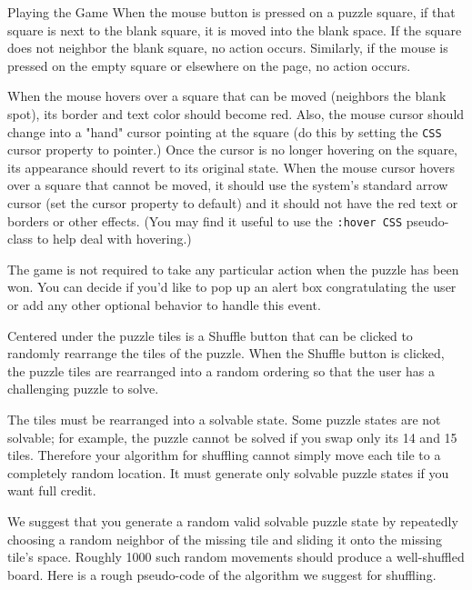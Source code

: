 \documentclass[programming]{../../../../mfcs}
\begin{document}
\begin{question}{Playing the Game}
When the mouse button is pressed on a puzzle square, if that square is next to the blank square, it is moved into the
blank space. If the square does not neighbor the blank square, no action occurs. Similarly, if the mouse is pressed
on the empty square or elsewhere on the page, no action occurs.
\newline

When the mouse hovers over a square that can be moved (neighbors the blank spot), its border and text color
should become red. Also, the mouse cursor should change into a "hand" cursor pointing at the square (do this by
setting the \texttt{CSS} cursor property to pointer.) Once the cursor is no longer hovering on the square, its appearance
should revert to its original state. When the mouse cursor hovers over a square that cannot be moved, it should use
the system's standard arrow cursor (set the cursor property to default) and it should not have the red text or
  borders or other effects. (You may find it useful to use the \texttt{:hover CSS} pseudo-class to help deal with hovering.)
\newline

The game is not required to take any particular action when the puzzle has been won. You can decide if you'd like
to pop up an alert box congratulating the user or add any other optional behavior to handle this event.
\newline

Centered under the puzzle tiles is a Shuffle button that can be clicked to randomly rearrange the tiles of the puzzle.
When the Shuffle button is clicked, the puzzle tiles are rearranged into a random ordering so that the user has a
challenging puzzle to solve.
\newline

The tiles must be rearranged into a solvable state. Some puzzle states are not solvable; for example, the puzzle
cannot be solved if you swap only its 14 and 15 tiles. Therefore your algorithm for shuffling cannot simply move
each tile to a completely random location. It must generate only solvable puzzle states if you want full credit.
\newpage

We suggest that you generate a random valid solvable puzzle state by repeatedly choosing a random neighbor of the
missing tile and sliding it onto the missing tile's space. Roughly 1000 such random movements should produce a
well-shuffled board. Here is a rough pseudo-code of the algorithm we suggest for shuffling.


\end{question}
\end{document}
